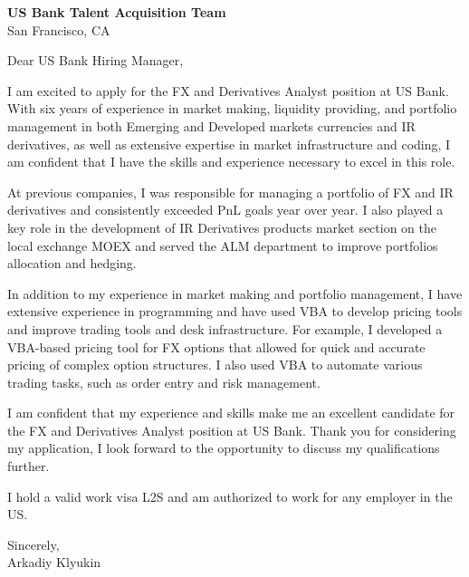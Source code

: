 \documentclass{letter}
\begin{document}
\begin{letter}{\textbf{US Bank Talent Acquisition Team} \\
                San Francisco, CA}


\opening{Dear US Bank Hiring Manager,}

I am excited to apply for the FX and Derivatives Analyst position at US Bank. With six years of experience in market making, liquidity providing, and portfolio management in both Emerging and Developed markets currencies and IR derivatives, as well as extensive expertise in market infrastructure and coding, I am confident that I have the skills and experience necessary to excel in this role.

At previous companies, I was responsible for managing a portfolio of FX and IR derivatives and consistently exceeded PnL goals year over year. I also played a key role in the development of IR Derivatives products market section on the local exchange MOEX and served the ALM department to improve portfolios allocation and hedging.

In addition to my experience in market making and portfolio management, I have extensive experience in programming and have used VBA to develop pricing tools and improve trading tools and desk infrastructure. For example, I developed a VBA-based pricing tool for FX options that allowed for quick and accurate pricing of complex option structures. I also used VBA to automate various trading tasks, such as order entry and risk management.

I am confident that my experience and skills make me an excellent candidate for the FX and Derivatives Analyst position at US Bank. Thank you for considering my application, I look forward to the opportunity to discuss my qualifications further.

I hold a valid work visa L2S and am authorized to work for any employer in the US.

Sincerely,\\
Arkadiy Klyukin
\end{letter}
\end{document}
